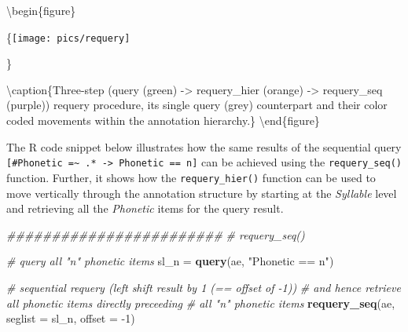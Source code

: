 \documentclass[]{book}
\newenvironment{Shaded}{\begin{snugshade}}{\end{snugshade}}
\newcommand{\CommentTok}[1]{\textcolor[rgb]{0.56,0.35,0.01}{\textit{#1}}}
\newcommand{\DataTypeTok}[1]{\textcolor[rgb]{0.13,0.29,0.53}{#1}}
\newcommand{\DecValTok}[1]{\textcolor[rgb]{0.00,0.00,0.81}{#1}}
\newcommand{\KeywordTok}[1]{\textcolor[rgb]{0.13,0.29,0.53}{\textbf{#1}}}
\newcommand{\NormalTok}[1]{#1}
\newcommand{\StringTok}[1]{\textcolor[rgb]{0.31,0.60,0.02}{#1}}
\begin{document}
\textbackslash{}begin\{figure\}

\{\centering \texttt{[image: pics/requery]}

\}

\textbackslash{}caption\{Three-step (query (green) -\textgreater{} requery\_hier (orange) -\textgreater{} requery\_seq (purple)) requery procedure, its single query (grey) counterpart and their color coded movements within the annotation hierarchy.\}\label{fig:query-requery}
\textbackslash{}end\{figure\}

The R code snippet below illustrates how the same results of the sequential query \texttt{{[}\#Phonetic\ =\textasciitilde{}\ .*\ -\textgreater{}\ Phonetic\ ==\ n{]}} can be achieved using the \texttt{requery\_seq()} function. Further, it shows how the \texttt{requery\_hier()} function can be used to move vertically through the annotation structure by starting at the \emph{Syllable} level and retrieving all the \emph{Phonetic} items for the query result.

\begin{Shaded}
\begin{Highlighting}[]
\CommentTok{########################}
\CommentTok{# requery_seq()}

\CommentTok{# query all "n" phonetic items}
\NormalTok{sl_n =}\StringTok{ }\KeywordTok{query}\NormalTok{(ae, }\StringTok{"Phonetic == n"}\NormalTok{)}

\CommentTok{# sequential requery (left shift result by 1 (== offset of -1))}
\CommentTok{# and hence retrieve all phonetic items directly preceeding}
\CommentTok{# all "n" phonetic items}
\KeywordTok{requery_seq}\NormalTok{(ae, }
            \DataTypeTok{seglist =}\NormalTok{ sl_n, }
            \DataTypeTok{offset =} \DecValTok{-1}\NormalTok{)}
\end{Highlighting}
\end{Shaded}
\end{document}
